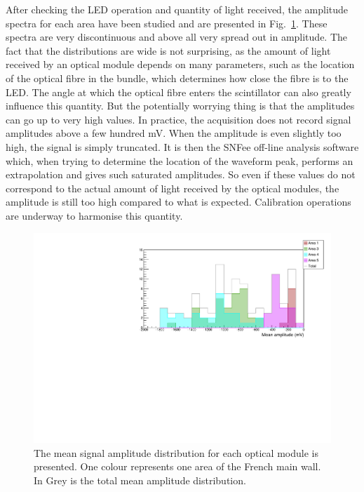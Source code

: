 After checking the LED operation and quantity of light received, the amplitude spectra for each area have been studied and are presented in Fig.~\ref{fig:LI_ampl}.
These spectra are very discontinuous and above all very spread out in amplitude.
The fact that the distributions are wide is not surprising, as the amount of light received by an optical module depends on many parameters, such as the location of the optical fibre in the bundle, which determines how close the fibre is to the LED.
The angle at which the optical fibre enters the scintillator can also greatly influence this quantity.
But the potentially worrying thing is that the amplitudes can go up to very high values.
In practice, the acquisition does not record signal amplitudes above a few hundred mV.
When the amplitude is even slightly too high, the signal is simply truncated.
It is then the SNFee off-line analysis software which, when trying to determine the location of the waveform peak, performs an extrapolation and gives such saturated amplitudes.
So even if these values do not correspond to the actual amount of light received by the optical modules, the amplitude is still too high compared to what is expected.
Calibration operations are underway to harmonise this quantity.
\begin{figure}[h!]
  \centering
  \includegraphics[width=15cm]{commissioning/fig_commissioning/LI_mean_ampl.pdf}
  \caption{The mean signal amplitude distribution for each optical module is presented.
    One colour represents one area of the French main wall.
    In Grey is the total mean amplitude distribution.
    \label{fig:LI_ampl}}
\end{figure}

